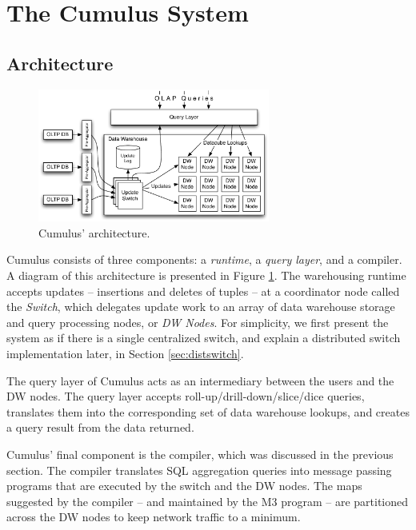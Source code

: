 
\section{The Cumulus System}
\label{sec:architecture}


\subsection{Architecture}


\begin{figure}
\begin{center}
\includegraphics[width=3in]{images/Architecture.pdf}
\caption{Cumulus' architecture.}
\label{fig:arch}
\end{center}
\end{figure}


Cumulus consists of three components: a {\em runtime}, a {\em query layer},
and a compiler.  A diagram of this architecture is presented in Figure \ref{fig:arch}.  The warehousing runtime accepts updates -- insertions and deletes of tuples -- at a coordinator node called the \textit{Switch}, which delegates update work to an array of data warehouse storage and query processing nodes, or \textit{DW Nodes}.  For simplicity, we first present the system as if there is a single centralized switch, and explain a distributed switch implementation later, in Section \ref{sec:distswitch}.

The query layer of Cumulus acts as an intermediary between the users
and the DW nodes.  The query layer accepts roll-up/drill-down/slice/dice
queries, translates them into the corresponding set of data warehouse
lookups, and creates a query result from the data returned.
%

Cumulus' final component is the compiler, which was discussed in the
previous section. The compiler translates SQL aggregation queries
into message passing programs that are executed by the switch and the DW nodes.
The maps suggested by the compiler -- and maintained by the M3 program --
are partitioned across the DW nodes to keep network traffic to a minimum.  


